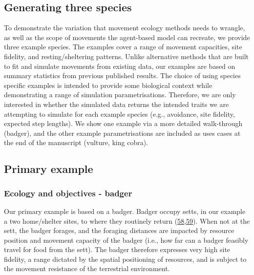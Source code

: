 \documentclass[10pt,a4paper]{article}
\begin{document}
\hypertarget{generating-three-species}{%
\subsection{Generating three species}\label{generating-three-species}}

To demonstrate the variation that movement ecology methods needs to wrangle, as well as the scope of movements the agent-based model can recreate, we provide three example species.
The examples cover a range of movement capacities, site fidelity, and resting/sheltering patterns.
Unlike alternative methods that are built to fit and simulate movements from existing data, our examples are based on summary statistics from previous published results.
The choice of using species specific examples is intended to provide some biological context while demonstrating a range of simulation parametrisations.
Therefore, we are only interested in whether the simulated data returns the intended traits we are attempting to simulate for each example species (e.g., avoidance, site fidelity, expected step lengths).
We show one example via a more detailed walk-through (badger), and the other example parametrisations are included as uses cases at the end of the manuscript (vulture, king cobra).

\hypertarget{primary-example}{%
\subsection{Primary example}\label{primary-example}}

\hypertarget{ecology-and-objectives---badger}{%
\subsubsection{Ecology and objectives - badger}\label{ecology-and-objectives---badger}}

Our primary example is based on a badger.
Badger occupy setts, in our example a two home/shelter sites, to where they routinely return (\protect\hyperlink{ref-kowalczyk_daily_2006}{58},\protect\hyperlink{ref-feore_habitat_1999}{59}).
When not at the sett, the badger forages, and the foraging distances are impacted by resource position and movement capacity of the badger (i.e., how far can a badger feasibly travel for food from the sett).
The badger therefore expresses very high site fidelity, a range dictated by the spatial positioning of resources, and is subject to the movement resistance of the terrestrial environment.
\end{document}
